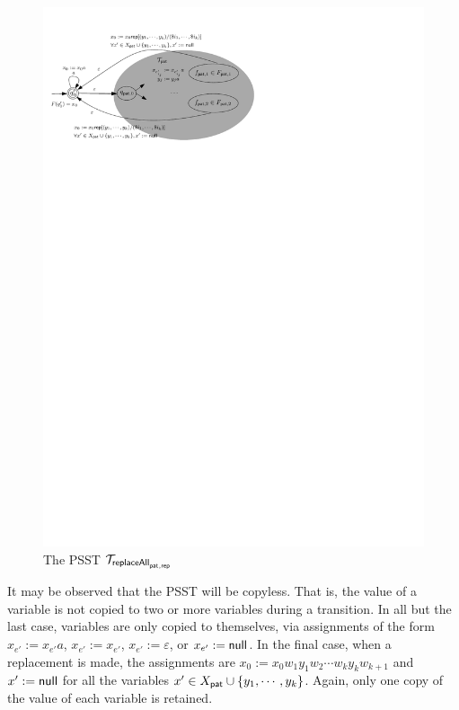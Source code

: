 \begin{figure}[ht]
    \centering
    \includegraphics[scale=0.7]{psst-replaceall.pdf}
    \caption{The PSST $\mathcal{T}_{\mathsf{replaceAll}_{\mathsf{pat},\mathsf{rep}}}$}
    \label{fig-psst-replaceall}
\end{figure}



It may be observed that the PSST will be copyless.
That is, the value of a variable is not copied to two or more variables during a transition.
In all but the last case, variables are only copied to themselves, via assignments of the form $x_{e'} := x_{e'} a$, $x_{e'} := x_{e'}$, $x_{e'} := \varepsilon$, or $x_{e'} := \mathsf{null}$.
In the final case, when a replacement is made, the assignments are
$x_0 := x_0 w_1y_1 w_2 \cdots w_k y_k w_{k+1}$
and
$x^\prime := \mathsf{null}$ for all the variables $x^\prime \in X_{\mathsf{pat}} \cup \{y_1, \cdots, y_k\}$.
Again, only one copy of the value of each variable is retained.

